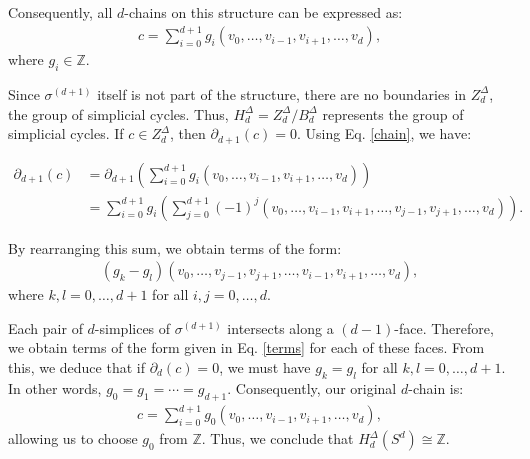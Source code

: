 \begin{example}
\begin{itemize}
		      Consequently, all \(d\)-chains on this structure can be expressed as:
		      \begin{align}
		      	\label{chain}                                                               
		      	c = \sum_{i=0}^{d+1}g_{i} (v_{0}, \ldots, v_{i-1}, v_{i+1}, \ldots, v_{d}), 
		      \end{align}
		      where \(g_{i} \in \mathbb{Z}\).
		      		      		      		      
		      Since \(\sigma^{(d+1)}\) itself is not part of the structure, there are no
		      boundaries in \(Z^{\Delta}_{d}\), the group of simplicial cycles. Thus, \(H^{\Delta}_{d} = Z^{\Delta}_{d} / B^{\Delta}_{d}\) represents the group of simplicial
		      cycles. If \(c \in Z^{\Delta}_{d}\), then \(\partial_{d+1}(c) = 0\). Using Eq.
		      \ref{chain}, we have:
		      \begin{scriptsize}
		      	\begin{align}
		      		\partial_{d+1}(c) & = \partial_{d+1}\left( \sum_{i=0}^{d+1}g_{i} (v_{0}, \ldots, v_{i-1}, v_{i+1}, \ldots, v_{d}) \right)                                       \\
		      		                  & = \sum_{i=0}^{d+1}g_{i} \left( \sum_{j=0}^{d+1}(-1)^{j} (v_{0}, \ldots, v_{i-1}, v_{i+1}, \ldots, v_{j-1}, v_{j+1}, \ldots, v_{d}) \right). 
		      	\end{align}
		      \end{scriptsize}
		      By rearranging this sum, we obtain terms of the form:
		      \begin{align}
		      	\label{terms}                                                                              
		      	(g_{k} - g_{l})(v_{0}, \ldots, v_{j-1}, v_{j+1}, \ldots, v_{i-1}, v_{i+1}, \ldots, v_{d}), 
		      \end{align}
		      where \(k, l = 0, \ldots, d+1\) for all \(i, j = 0, \ldots, d\).
		      		      		      		      
		      Each pair of \(d\)-simplices of \(\sigma^{(d+1)}\) intersects along a \((d-1)\)-face.
		      Therefore, we obtain terms of the form given in Eq. \ref{terms} for each
		      of these faces. From this, we deduce that if \(\partial_{d}(c) = 0\), we must
		      have \(g_{k} = g_{l}\) for all \(k, l = 0, \ldots, d+1\). In other words, \(g_{0}
		      = g_{1} = \cdots = g_{d+1}\). Consequently, our original \(d\)-chain is:
		      \begin{align}
		      	c = \sum_{i=0}^{d+1}g_{0} (v_{0}, \ldots, v_{i-1}, v_{i+1}, \ldots, v_{d}), 
		      \end{align}
		      allowing us to choose \(g_{0}\) from \(\mathbb{Z}\). Thus, we conclude that
		      \(H^{\Delta}_{d}(S^{d}) \cong \mathbb{Z}\).
		      		      		      		      

\end{itemize}
\end{example}
